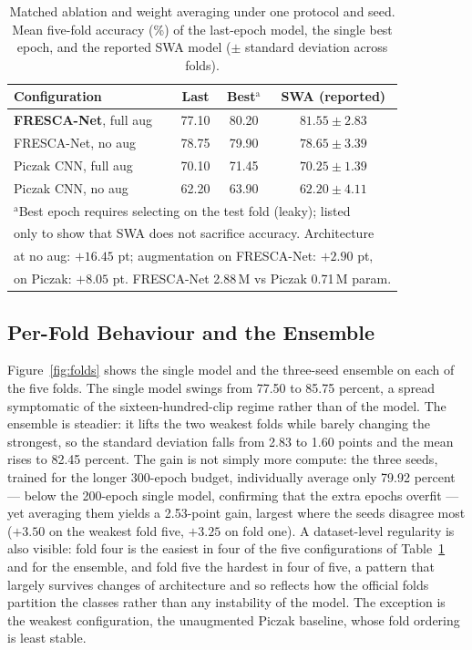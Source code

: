 \documentclass[conference]{IEEEtran}
\begin{document}
\begin{table}[t]
\caption{Matched ablation and weight averaging under one protocol and seed. Mean five-fold accuracy (\%) of the last-epoch model, the single best epoch, and the reported SWA model ($\pm$ standard deviation across folds).}
\label{tab:ablation}
\begin{center}
\renewcommand{\arraystretch}{1.05}
\begin{tabular}{|l|c|c|c|}
\hline
\textbf{Configuration} & \textbf{Last} & \textbf{Best$^{\mathrm{a}}$} & \textbf{SWA (reported)} \\
\hline
\textbf{FRESCA-Net}, full aug & 77.10 & 80.20 & $\mathbf{81.55 \pm 2.83}$ \\
FRESCA-Net, no aug & 78.75 & 79.90 & $78.65 \pm 3.39$ \\
Piczak CNN, full aug & 70.10 & 71.45 & $70.25 \pm 1.39$ \\
Piczak CNN, no aug & 62.20 & 63.90 & $62.20 \pm 4.11$ \\
\hline
\multicolumn{4}{l}{\footnotesize $^{\mathrm{a}}$Best epoch requires selecting on the test fold (leaky); listed} \\
\multicolumn{4}{l}{\footnotesize only to show that SWA does not sacrifice accuracy. Architecture} \\
\multicolumn{4}{l}{\footnotesize at no aug: $+16.45$ pt; augmentation on FRESCA-Net: $+2.90$ pt,} \\
\multicolumn{4}{l}{\footnotesize on Piczak: $+8.05$ pt. FRESCA-Net 2.88\,M vs Piczak 0.71\,M param.} \\
\end{tabular}
\end{center}
\end{table}

\subsection{Per-Fold Behaviour and the Ensemble}
Figure~\ref{fig:folds} shows the single model and the three-seed ensemble on each of the five folds. The single model swings from 77.50 to 85.75 percent, a spread symptomatic of the sixteen-hundred-clip regime rather than of the model. The ensemble is steadier: it lifts the two weakest folds while barely changing the strongest, so the standard deviation falls from 2.83 to 1.60 points and the mean rises to 82.45 percent. The gain is not simply more compute: the three seeds, trained for the longer 300-epoch budget, individually average only 79.92 percent --- below the 200-epoch single model, confirming that the extra epochs overfit --- yet averaging them yields a 2.53-point gain, largest where the seeds disagree most ($+3.50$ on the weakest fold five, $+3.25$ on fold one). A dataset-level regularity is also visible: fold four is the easiest in four of the five configurations of Table~\ref{tab:ablation} and for the ensemble, and fold five the hardest in four of five, a pattern that largely survives changes of architecture and so reflects how the official folds partition the classes rather than any instability of the model. The exception is the weakest configuration, the unaugmented Piczak baseline, whose fold ordering is least stable.
\end{document}

